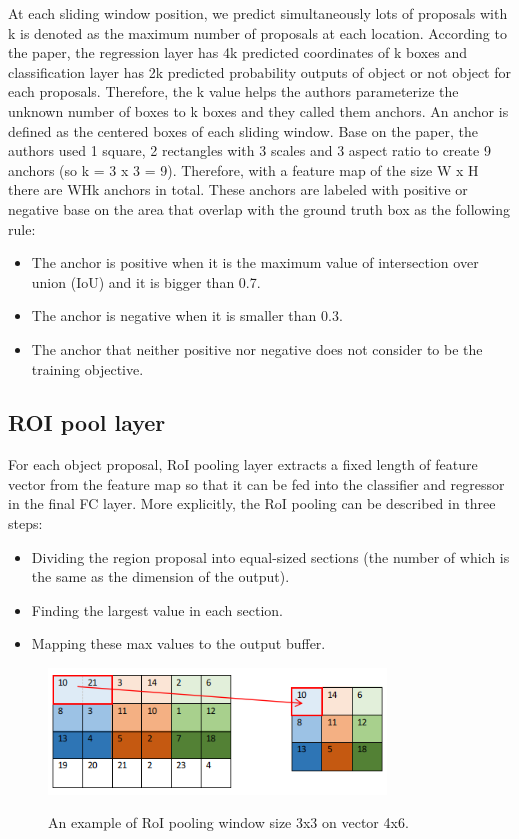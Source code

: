 	At each sliding window position, we predict simultaneously lots of proposals with k is denoted as the maximum number of proposals at each location. According to the paper, the regression layer has 4k predicted coordinates of k boxes and classification layer has 2k predicted probability outputs of object or not object for each proposals. Therefore, the k value helps the authors parameterize the unknown number of boxes to k boxes and they called them anchors. 
	An anchor is defined as the centered boxes of each sliding window. Base on the paper, the authors used 1 square, 2 rectangles with 3 scales and 3 aspect ratio to create 9 anchors (so k = 3 x 3 = 9). Therefore, with a feature map of the size W x H there are WHk anchors in total. These anchors are labeled with positive or negative base on the area that overlap with the ground truth box as the following rule:
	\begin{itemize}
		\item The anchor is positive when it is the maximum value of intersection over union (IoU) and it is bigger than 0.7.
		\item The anchor is negative when it is smaller than 0.3.
		\item The anchor that neither positive nor negative does not consider to be the training objective.
	\end{itemize}
	
\subsection{ROI pool layer}
\noindent	
	
	For each object proposal, RoI pooling layer extracts a fixed length of feature vector from the feature map so that it can be fed into the classifier and regressor in the final FC layer. More explicitly, the RoI pooling can be described in three steps:
	\begin{itemize}
		\item Dividing the region proposal into equal-sized sections (the number of which is the same as the dimension of the output).
		\item Finding the largest value in each section.
		\item Mapping these max values to the output buffer.
	\end{itemize}
	
	\begin{figure}[H]
		\centering
		{\includegraphics[width=0.8\textwidth]{./hinhanh/chap4/roi_quantization.png}}
		\caption{An example of RoI pooling window size 3x3 on vector 4x6.}
	\end{figure}
	
